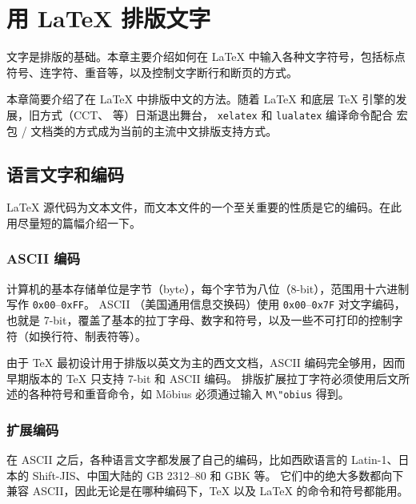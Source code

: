 \chapter{用 \LaTeX{} 排版文字}\label{chap:text}

\begin{intro}
文字是排版的基础。本章主要介绍如何在 \LaTeX{} 中输入各种文字符号，包括标点符号、连字符、重音等，以及控制文字断行和断页的方式。

本章简要介绍了在 \LaTeX{} 中排版中文的方法。随着 \LaTeX{} 和底层 \TeX{} 引擎的发展，旧方式（CCT、 等）日渐退出舞台，
\texttt{xelatex} 和 \texttt{lualatex} 编译命令配合  宏包 / 文档类的方式成为当前的主流中文排版支持方式。
\end{intro}

\section{语言文字和编码}\label{sec:encoding}

\LaTeX{} 源代码为文本文件，而文本文件的一个至关重要的性质是它的编码。在此用尽量短的篇幅介绍一下。

\subsection{ASCII 编码}\label{subsec:ascii}

计算机的基本存储单位是字节（byte），每个字节为八位（8-bit），范围用十六进制写作 \texttt{0x00}--\texttt{0xFF}。
ASCII （美国通用信息交换码）使用 \texttt{0x00}--\texttt{0x7F} 对文字编码，也就是 7-bit，覆盖了基本的拉丁字母、数字和符号，以及一些不可打印的控制字符（如换行符、制表符等）。

由于 \TeX{} 最初设计用于排版以英文为主的西文文档，ASCII 编码完全够用，因而早期版本的 \TeX{} 只支持 7-bit 和 ASCII 编码。
排版扩展拉丁字符必须使用后文所述的各种符号和重音命令，如 M\"obius 必须通过输入 \verb|M\"obius| 得到。

\subsection{扩展编码}\label{subsec:ext-encoding}

在 ASCII 之后，各种语言文字都发展了自己的编码，比如西欧语言的 Latin-1、日本的 Shift-JIS、中国大陆的 GB 2312--80 和 GBK 等。
它们中的绝大多数都向下兼容 ASCII，因此无论是在哪种编码下，\TeX{} 以及 \LaTeX{} 的命令和符号都能用。

